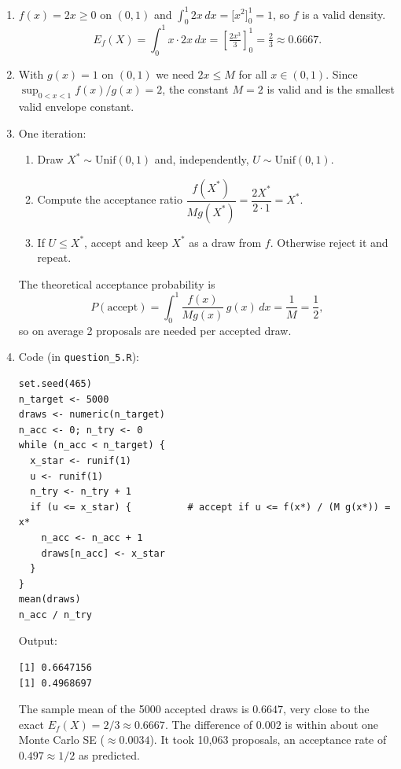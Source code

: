 \documentclass[11pt]{article}
\begin{document}
\begin{enumerate}
\item $f(x) = 2x \ge 0$ on $(0,1)$ and $\int_0^1 2x\,dx = \big[x^2\big]_0^1 = 1$, so $f$ is a valid density.
\[
E_f(X) = \int_0^1 x\cdot 2x\,dx = \left[\tfrac{2x^3}{3}\right]_0^1 = \tfrac{2}{3} \approx 0.6667 .
\]

\item With $g(x) = 1$ on $(0,1)$ we need $2x \le M$ for all $x\in(0,1)$. Since $\sup_{0<x<1} f(x)/g(x) = 2$, the constant $M = 2$ is valid and is the smallest valid envelope constant.

\item One iteration:
  \begin{enumerate}[label=\arabic*.]
  \item Draw $X^* \sim \text{Unif}(0,1)$ and, independently, $U \sim \text{Unif}(0,1)$.
  \item Compute the acceptance ratio $\dfrac{f(X^*)}{M g(X^*)} = \dfrac{2X^*}{2\cdot 1} = X^*$.
  \item If $U \le X^*$, accept and keep $X^*$ as a draw from $f$. Otherwise reject it and repeat.
  \end{enumerate}
The theoretical acceptance probability is
\[
P(\text{accept}) = \int_0^1 \frac{f(x)}{M g(x)}\,g(x)\,dx = \frac{1}{M} = \frac{1}{2},
\]
so on average 2 proposals are needed per accepted draw.

\item Code (in \texttt{question\_5.R}):
\begin{lstlisting}
set.seed(465)
n_target <- 5000
draws <- numeric(n_target)
n_acc <- 0; n_try <- 0
while (n_acc < n_target) {
  x_star <- runif(1)
  u <- runif(1)
  n_try <- n_try + 1
  if (u <= x_star) {          # accept if u <= f(x*) / (M g(x*)) = x*
    n_acc <- n_acc + 1
    draws[n_acc] <- x_star
  }
}
mean(draws)
n_acc / n_try
\end{lstlisting}
Output:
\begin{lstlisting}[style=out]
[1] 0.6647156
[1] 0.4968697
\end{lstlisting}
The sample mean of the 5000 accepted draws is $0.6647$, very close to the exact $E_f(X) = 2/3 \approx 0.6667$. The difference of $0.002$ is within about one Monte Carlo SE ($\approx 0.0034$). It took 10{,}063 proposals, an acceptance rate of $0.497 \approx 1/2$ as predicted.


\end{enumerate}
\end{document}
